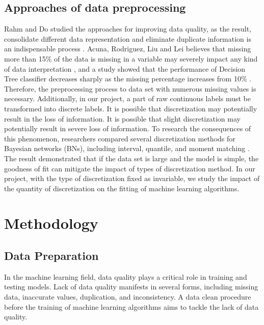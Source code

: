 \documentclass[conference]{IEEEtran}
\begin{document}
\subsection{Approaches of data preprocessing}
Rahm and Do studied the approaches for improving data quality, as the result, consolidate different data representation and eliminate duplicate information is an indispensable process \cite{b15}. Acuna, Rodriguez, Liu and Lei believes that missing more than 15\% of the data is missing in a variable may severely impact any kind of data interpretation \cite{b16}\cite{b17}, and a study showed that the performance of Decision Tree classifier decreases sharply as the missing percentage increases from 10\% \cite{b18}. Therefore, the preprocessing process to data set with numerous missing values is necessary. Additionally, in our project, a part of raw continuous labels must be transformed into discrete labels. It is possible that discretization may potentially result in the loss of information. It is possible that slight discretization may potentially result in severe loss of information. To research the consequences of this phenomenon, researchers compared several discretization methods for Bayesian networks (BNs), including interval, quantile, and moment matching \cite{b19}. The result demonstrated that if the data set is large and the model is simple, the goodness of fit can mitigate the impact of types of discretization method. In our project, with the type of discretization fixed as invariable, we study the impact of the quantity of discretization on the fitting of machine learning algorithms.

\section{Methodology}
\subsection{Data Preparation}
In the machine learning field, data quality plays a critical role in training and testing models. Lack of data quality manifests in several forms, including missing data, inaccurate values, duplication, and inconsistency\cite{b20}. A data clean procedure before the training of machine learning algorithms aims to tackle the lack of data quality.
\end{document}
